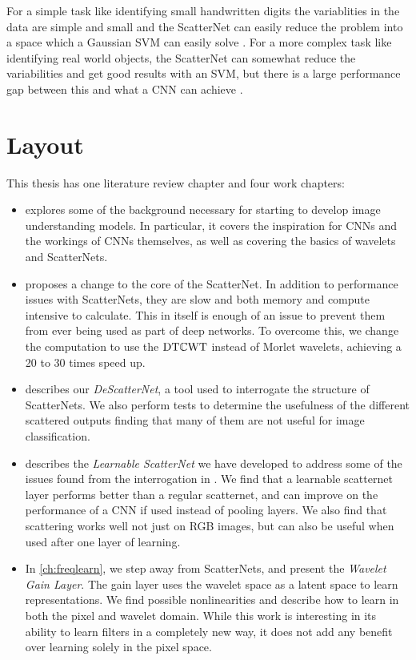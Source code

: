 For a simple task like identifying small handwritten digits
the variablities in the data are simple and small and the ScatterNet can easily
reduce the problem into a space which a Gaussian SVM can easily solve
\cite{bruna_invariant_2013}. For a more complex task like identifying real world
objects, the ScatterNet can somewhat reduce the variabilities and get good
results with an SVM, but there is a large performance gap between this and what a CNN can achieve
\cite{oyallon_deep_2015}.

\section{Layout}
This thesis has one literature review chapter and four work chapters:
\begin{itemize}
\item
   explores some of the background necessary for starting
  to develop image understanding models. In particular, it covers the
  inspiration for CNNs and the workings of CNNs themselves, as well as covering
  the basics of wavelets and ScatterNets.
\item 
   proposes a change to the core of the ScatterNet. In
  addition to performance issues with ScatterNets, they are slow and both
  memory and compute intensive to calculate. This in itself is enough of an
  issue to prevent them from ever being used as part of deep networks. To
  overcome this, we change the computation to use the $\mathrm{DT}\mathbb{C}\mathrm{WT}$
  \cite{selesnick_dual-tree_2005} instead of Morlet wavelets, achieving a 20 to
  30 times speed up.
\item 
   describes our \emph{DeScatterNet}, a tool used to
  interrogate the structure of ScatterNets. We also perform tests to determine
  the usefulness of the different scattered outputs finding that many of them
  are not useful for image classification.
\item 
   describes the \emph{Learnable ScatterNet} we have developed to 
  address some of the issues found from the interrogation in
  . We find that a learnable scatternet layer performs
  better than a regular scatternet, and can improve on the performance of a CNN 
  if used instead of pooling layers. We also find that scattering works well not
  just on RGB images, but can also be useful when used after one layer of
  learning.
\item
  In \autoref{ch:freqlearn}, we step away from ScatterNets, and present the
  \emph{Wavelet Gain Layer}. The gain layer uses 
  the wavelet space as a latent space to learn representations. We find possible
  nonlinearities and describe how to learn in both the pixel and wavelet domain.
  While this work is interesting in its ability to learn filters in a completely
  new way, it does not add any benefit over learning solely in the pixel space.
\end{itemize}

